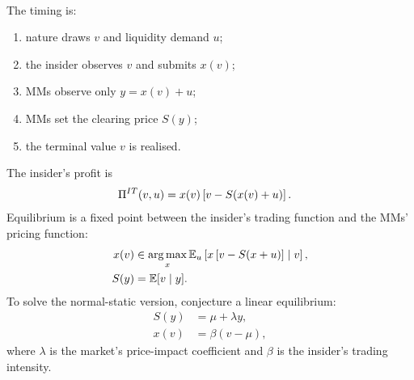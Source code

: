 \begin{model}
\par\smallskip\noindent{}\\
The timing is:
\begin{enumerate}[label=\roman*.]
\setlength{\itemsep}{0pt}
\item nature draws $v$ and liquidity demand $u$;
\item the insider observes $v$ and submits $x(v)$;
\item MMs observe only $y=x(v)+u$;
\item MMs set the clearing price $S(y)$;
\item the terminal value $v$ is realised.
\end{enumerate}
The insider's profit is
\begin{align*}
\Pi^{IT}(v,u)&=x(v)\left[v-S(x(v)+u)\right].
\end{align*}
Equilibrium is a fixed point between the insider's trading function and the MMs' pricing function:
\begin{align*}
x(v)&\in\operatorname*{arg\,max}_{x}\mathbb{E}_u\left[x\left[v-S(x+u)\right]\mid v\right],\\
S(y)&=\mathbb{E}[v\mid y].
\end{align*}
To solve the normal-static version, conjecture a linear equilibrium:
\begin{align*}
S(y)&=\mu+\lambda y,\\
x(v)&=\beta(v-\mu),
\end{align*}
where $\lambda$ is the market's price-impact coefficient and $\beta$ is the insider's trading intensity.


\end{model}
